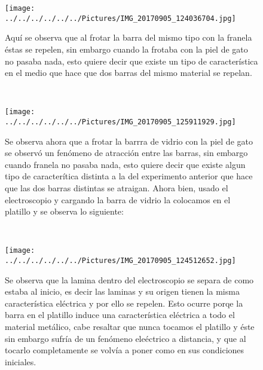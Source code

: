 \documentclass[11pt,a4paper]{article}
\begin{document}
\begin{figure}[hbtp]
\centering 
\texttt{[image: ../../../../../../Pictures/IMG\_20170905\_124036704.jpg]}
\caption{Aqu\'{i} se observa que al frotar la barra del mismo tipo con la franela \'{e}stas se repelen, sin embargo cuando la frotaba con la piel de gato no pasaba nada, esto quiere decir que existe un tipo de caracter\'{i}stica en el medio que hace que dos barras del mismo material se repelan.}
\end{figure}
\\
\begin{figure}[hbtp]
\centering
\texttt{[image: ../../../../../../Pictures/IMG\_20170905\_125911929.jpg]}
\caption{Se observa ahora que a frotar la barrra de vidrio con la piel de gato se observ\'{o} un fen\'{o}meno de atracci\'{o}n entre las barras, sin embargo cuando franela no pasaba nada, esto quiere decir que existe algun tipo de caracter\'{i}tica distinta a la del experimento anterior que hace que las dos barras distintas se atraigan. Ahora bien, usado el electroscopio y cargando la barra de vidrio la colocamos en el platillo y se observa lo siguiente:
}
\end{figure}
\\
\begin{figure}[hbtp]
\centering
\texttt{[image: ../../../../../../Pictures/IMG\_20170905\_124512652.jpg]}
\caption{Se observa que la lamina dentro del electroscopio se separa de como estaba al inicio, es decir las laminas y su origen tienen la misma caracter\'{i}stica el\'{e}ctrica y por ello se repelen. Esto ocurre porqe la barra en el platillo induce una caracter\'{i}stica el\'{e}ctrica a todo el material met\'{a}lico, cabe resaltar que nunca tocamos el platillo y \'{e}ste sin embargo sufr\'{i}a de un fen\'{o}meno ele\'{e}ctrico a distancia, y que al tocarlo completamente se volv\'{i}a a poner como en sus condiciones iniciales.}
\end{figure}
\\
\pagebreak
\end{document}
